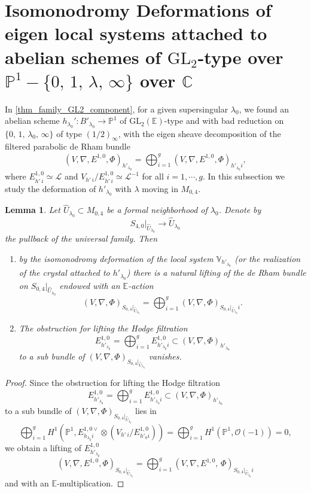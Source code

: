 \documentclass[12pt,twoside]{book}
\theoremstyle{plain}
\newtheorem{lemma}[lemma]{Lemma}
\theoremstyle{definition}
\theoremstyle{remark}
\newcommand{\mL}{{\mathcal L}}
\numberwithin{equation}{section}
\def\EK{{\mathbb E}}
\begin{document}
\section{Isomonodromy Deformations of eigen local systems attached to abelian schemes of $\text{GL}_2$-type over $\mathbb P^1-\{0,\,1,\,\lambda,\,\infty\}$ over $\mathbb C$}

In \autoref{thm_family_GL2_component}, for a given supersingular $\lambda_0$, we found an abelian scheme $h_{\lambda_0}': B'_{\lambda_0}\to \mathbb P^1$ of $\text{GL}_2(\EK)$-type and with bad reduction on $\{0,\,1,\,\lambda_0,\,\infty \} $ of type $(1/2)_\infty$, with the eigen sheave decomposition of the filtered parabolic de Rham bundle
\[(V,\nabla,E^{1,0},\Phi)_{h'_{\lambda_0}}=\bigoplus_{i=1}^{g}(V,\nabla,E^{1,0},\Phi)_{h'_{\lambda_0} i},\]
where $E^{1,0}_{h'\,i}\simeq \mL$ and $V_{h'\,i}/ E^{1,0}_{h'\,i}\simeq \mL^{-1}$ for all $i=1,\cdots,g$. In this subsection we study the deformation of $h'_{\lambda_0}$ with $\lambda $ moving in $M_{0,4}$.

\begin{lemma} \label{thm_formal_deform_over_M04}
Let $\hat {U}_{\lambda_0}\subset M_{0,4}$ be a formal neighborhood of $\lambda_0$. Denote by \[S_{4,0}|_{\hat U_{\lambda_0}}\to \hat U_{\lambda_0}\] the pullback of the universal family. Then
\begin{enumerate}
\item by the isomonodromy deformation of the local system $\mathbb V_{h'_{\lambda_0}}$ (or the realization of the crystal attached to $h'_{\lambda_0}$) there is a natural lifting of the de Rham bundle on $S_{0,4}|_{\hat U_{\lambda_0}}$ endowed with an $\EK$-action
\[(V,\nabla,\Phi)_{ S_{0,4}|_{\hat U_{\lambda_0}}}=\bigoplus_{i=1}^{g}(V,\nabla,\Phi)_{ S_{0,4}|_{\hat U_{\lambda_0}} i}.\]
\item The obstruction for lifting the Hodge filtration
\[E^{1,0}_{h'_{\lambda_0}} =\bigoplus_{i=1}^{g} E^{1,0}_{{h'_{\lambda_0} i}}\subset (V,\nabla, \Phi)_{h'_{\lambda_0}}\]
to a sub bundle of $ (V,\nabla,\Phi)_{ S_{0,4}|_{\hat U_{\lambda_0}}}$ vanishes.
\end{enumerate}
\end{lemma}

\begin{proof}
Since the obstruction for lifting the Hodge filtration
\[E^{1,0}_{h'_{\lambda_0}} =\bigoplus_{i=1}^{g} E^{1,0}_{{h'_{\lambda_0} i}}\subset (V,\nabla, \Phi)_{h'_{\lambda_0}}\]
to a sub bundle of $ (V,\nabla,\Phi)_{ S_{0,4}|_{\hat U_{\lambda_0}}}$
lies in
$$ \bigoplus_{i=1}^{g}H^1(\mathbb P^1,E^{1,0\vee} _{h_{\lambda_0} i} \otimes (V_{h'\,i}/ E^{1,0}_{{h'_0}i})) =
\bigoplus_{i=1}^{g}H^1(\mathbb P^1,\mathcal O(-1) )=0, $$
we obtain a lifting of $E^{1,0}_{h'_{\lambda_0}}$
\[ (V,\nabla,E^{1,0},\Phi)_{S_{0,4}|_{\hat U_{\lambda_0}}}=\bigoplus_{i=1}^{g}(V,\nabla,E^{1,0},\,\Phi)_{ S_{0,4}|_{\hat U_{\lambda_0}}i}\]
and with an $\EK$-multiplication.
\end{proof}
\end{document}
